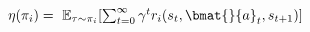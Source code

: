 $\eta(\pi_i)=\ \mathbb{E}_{\tau\sim\pi_i}[\sum_{t=0}^{\infty}\gamma^tr_i(s_t,\bmat{}{a}_t,s_{t+1})]$

